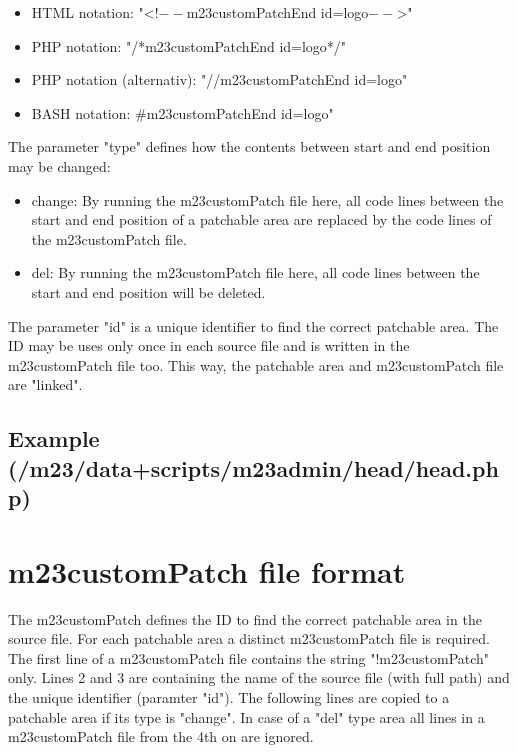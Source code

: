\begin{itemize}
	\item HTML notation: "<!$--$m23customPatchEnd id=logo$--$>"
	\item PHP notation: "/*m23customPatchEnd id=logo*/"
	\item PHP notation (alternativ): "//m23customPatchEnd id=logo"
	\item BASH notation: \#m23customPatchEnd id=logo"
\end{itemize}

The parameter "type" defines how the contents between start and end position may be changed:

\begin{itemize}
	\item change: By running the m23customPatch file here, all code lines between the start and end position of a patchable area are replaced by the code lines of the m23customPatch file.
	\item del: By running the m23customPatch file here, all code lines between the start and end position will be deleted.
\end{itemize}

The parameter "id" is a unique identifier to find the correct patchable area. The ID may be uses only once in each source file and is written in the m23customPatch file too. This way, the patchable area and m23customPatch file are "linked".

\subsection{Example (/m23/data+scripts/m23admin/head/head.php)}






\section{m23customPatch file format}
The m23customPatch defines the ID to find the correct patchable area in the source file. For each patchable area a distinct m23customPatch file is required. The first line of a m23customPatch file contains the string "!m23customPatch" only. Lines 2 and 3 are containing the name of the source file (with full path) and the unique identifier (paramter "id"). The following lines are copied to a patchable area if its type is "change". In case of a "del" type area all lines in a m23customPatch file from the 4th on are ignored.


